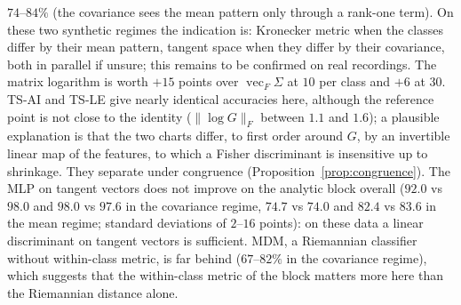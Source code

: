 \documentclass[11pt,a4paper]{article}
\theoremstyle{plain}
\theoremstyle{definition}
\theoremstyle{remark}
\newcommand{\vecop}{\operatorname{vec}}
\begin{document}
$74$--$84\%$ (the covariance sees the mean pattern only through a rank-one
term). On these two synthetic regimes the indication is: Kronecker metric
when the classes differ by their mean pattern, tangent space when they
differ by their covariance, both in parallel if unsure; this remains to be
confirmed on real recordings. The matrix logarithm is worth $+15$ points
over $\vecop_F\Sigma$ at $10$ per class and $+6$ at $30$. TS-AI and TS-LE
give nearly identical accuracies here, although the reference point is not
close to the identity ($\|\log G\|_F$ between $1.1$ and $1.6$); a plausible
explanation is that the two charts differ, to first order around $G$, by an
invertible linear map of the features, to which a Fisher discriminant is
insensitive up to shrinkage. They separate under congruence
(Proposition~\ref{prop:congruence}). The MLP on tangent vectors does not
improve on the analytic block overall ($92.0$ vs $98.0$ and $98.0$ vs
$97.6$ in the covariance regime, $74.7$ vs $74.0$ and $82.4$ vs $83.6$ in the
mean regime; standard deviations of $2$--$16$ points): on these data a linear discriminant on
tangent vectors is sufficient. MDM, a Riemannian classifier without
within-class metric, is far behind ($67$--$82\%$ in the covariance regime),
which suggests that the within-class metric of the block matters more here
than the Riemannian distance alone.
\end{document}

